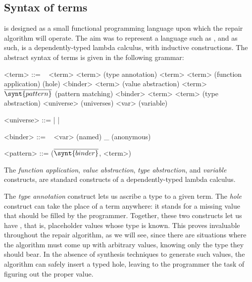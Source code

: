 \subsection{Syntax of \Chick{} terms}\label{chick-syntax-terms}

\Chick{} is designed as a small functional programming language upon which the
repair algorithm will operate.  The aim was to represent a language such as
\Gallina{}, and as such, \Chick{} is a dependently-typed lambda calculus, with
inductive constructions.  The abstract syntax of \Chick{} terms is given in the
following grammar:

\begin{grammar}%
<term> ::= \ %
\alt <term> \coqinline{:} <term>                         \hfill (type annotation)
\alt <term> <term>                                       \hfill (function application)
\alt \coqinline{_}                                       \hfill (hole)
\alt {} <binder> \coqinline{,} <term>         \hfill (value abstraction)
\alt {} <term> 
$\overline{ \synt{pattern} }$             \hfill (pattern matching)
\alt {} <binder> \coqinline{:} <term>
 <term>                                   \hfill (type abstraction)
\alt <universe>                                          \hfill (universes)
\alt <var>                                               \hfill (variable)

<universe> ::=  |  | 

<binder> ::= \ %
\alt <var> \hfill (named)
\alt _     \hfill (anonymous)

<pattern> ::= ($\overline{ \synt{binder} }$, <term>)
\end{grammar}

The \emph{function application}, \emph{value abstraction}, \emph{type
abstraction}, and \emph{variable} constructs, are standard constructs of a
dependently-typed lambda calculus.

The \emph{type annotation} construct lets us ascribe a type to a given term.
The \emph{hole} construct can take the place of a term anywhere: it stands for a
missing value that should be filled by the programmer.  Together, these two
constructs let us have , that is, placeholder values whose
type is known.  This proves invaluable throughout the repair algorithm, as we
will see, since there are situations where the algorithm must come up with
arbitrary values, knowing only the type they should bear.  In the absence of
synthesis techniques to generate such values, the algorithm can safely insert a
typed hole, leaving to the programmer the task of figuring out the proper value.

